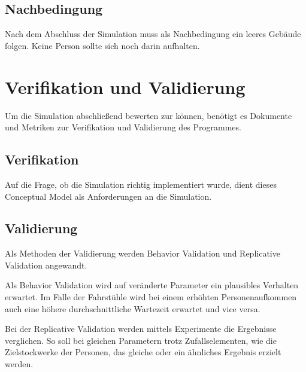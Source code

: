 \documentclass[envcountsame, envcountchap, deutsch]{i-studis}
\begin{document}
\hypertarget{nachbedingung}{%
\section{Nachbedingung}\label{nachbedingung}}

Nach dem Abschluss der Simulation muss als Nachbedingung ein leeres
Gebäude folgen. Keine Person sollte sich noch darin aufhalten.

\hypertarget{verifikation-und-validierung}{%
\chapter{Verifikation und
Validierung}\label{verifikation-und-validierung}}

Um die Simulation abschließend bewerten zur können, benötigt es
Dokumente und Metriken zur Verifikation und Validierung des Programmes.

\hypertarget{verifikation}{%
\section{Verifikation}\label{verifikation}}

Auf die Frage, ob die Simulation richtig implementiert wurde, dient
dieses Conceptual Model als Anforderungen an die Simulation.

\hypertarget{validierung}{%
\section{Validierung}\label{validierung}}

Als Methoden der Validierung werden Behavior Validation und Replicative
Validation angewandt.

Als Behavior Validation wird auf veränderte Parameter ein plausibles
Verhalten erwartet. Im Falle der Fahrstühle wird bei einem erhöhten
Personenaufkommen auch eine höhere durchschnittliche Wartezeit erwartet
und vice versa.

Bei der Replicative Validation werden mittels Experimente die Ergebnisse
verglichen. So soll bei gleichen Parametern trotz Zufallselementen, wie
die Zielstockwerke der Personen, das gleiche oder ein ähnliches Ergebnis
erzielt werden.




\end{document}
